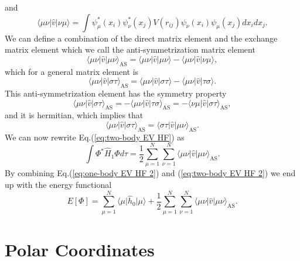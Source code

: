 \documentclass[../main.tex]{subfiles}
\begin{document}
and 
\begin{equation}
    \langle \mu \nu \vert \hat{v} \vert \nu \mu \rangle = \int \psi_\mu^*(x_i) \psi_\nu^*(x_j) V(r_{ij}) \psi_\nu(x_i) \psi_\mu(x_j) dx_i dx_j.
\end{equation}
We can define a combination of the direct matrix element and the exchange matrix element which we call the anti-symmetrization matrix element
\begin{equation}
    \langle \mu \nu \vert \hat{v} \vert \mu \nu \rangle_{\textrm{AS}} = \langle \mu \nu \vert \hat{v} \vert \mu \nu \rangle - \langle \mu \nu \vert \hat{v} \vert \nu \mu \rangle,
\end{equation}
which for a general matrix element is 
\begin{equation}
    \langle \mu \nu \vert \hat{v} \vert \sigma \tau \rangle_{\textrm{AS}} = \langle \mu \nu \vert \hat{v} \vert \sigma \tau \rangle - \langle \mu \nu \vert \hat{v} \vert \tau \sigma \rangle.
\end{equation}
This anti-symmetrization element has the symmetry property
\begin{equation}
    \langle \mu \nu \vert \hat{v} \vert \sigma \tau \rangle_{\textrm{AS}} = -\langle \mu \nu \vert \hat{v} \vert \tau \sigma \rangle_{\textrm{AS}} = -\langle \nu \mu \vert \hat{v} \vert \sigma \tau \rangle_{\textrm{AS}},
\end{equation}
and it is hermitian, which implies that 
\begin{equation}
    \langle \mu \nu \vert \hat{v} \vert \sigma \tau \rangle_{\textrm{AS}} = \langle \sigma \tau \vert \hat{v} \vert \mu \nu \rangle_{\textrm{AS}}.
\end{equation}
We can now rewrite Eq.(\ref{eq:two-body EV HF}) as 
\begin{equation}\label{eq:two-body EV HF 2}
    \int \Phi^* \hat{H}_1 \Phi d\tau = \frac{1}{2} \sum_{\mu=1}^N \sum_{\nu=1}^N \langle \mu \nu \vert \hat{v} \vert \mu \nu \rangle_{\textrm{AS}}.
\end{equation}
By combining Eq.(\ref{eq:one-body EV HF 2}) and (\ref{eq:two-body EV HF 2}) we end up with the energy functional 
\begin{equation}
    E\left[ \Phi \right] = \sum_{\mu=1}^N \langle \mu \vert \hat{h}_0 \vert \mu \rangle + \frac{1}{2} \sum_{\mu=1}^N \sum_{\nu=1}^N \langle \mu \nu \vert \hat{v} \vert \mu \nu \rangle_{\textrm{AS}}.
\end{equation}

\section{Polar Coordinates}
\end{document}
